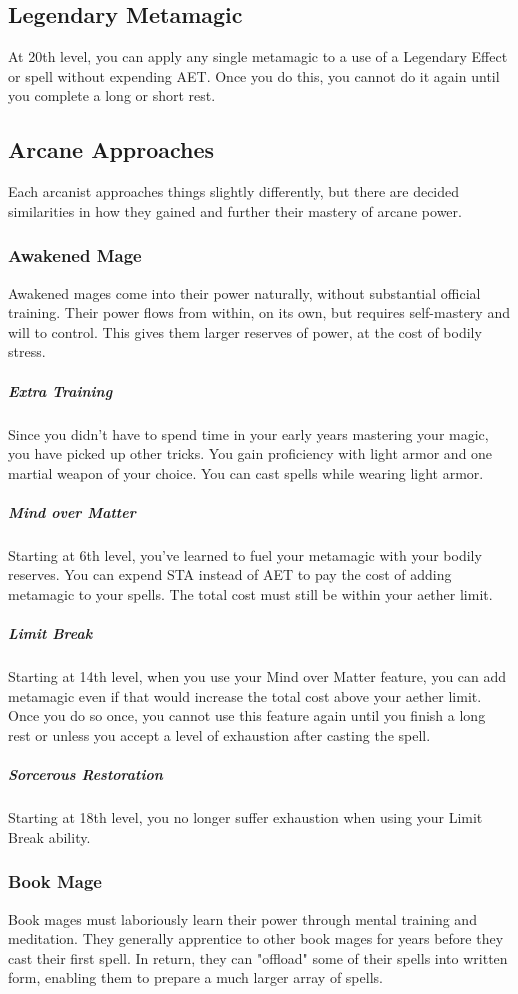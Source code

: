 \subsection{Legendary Metamagic}
At 20th level, you can apply any single metamagic to a use of a Legendary Effect or spell without expending AET. Once you do this, you cannot do it again until you complete a long or short rest.

\subsection{Arcane Approaches}

Each arcanist approaches things slightly differently, but there are decided similarities in how they gained and further their mastery of arcane power.

\subsubsection{Awakened Mage}
Awakened mages come into their power naturally, without substantial official training. Their power flows from within, on its own, but requires self-mastery and will to control. This gives them larger reserves of power, at the cost of bodily stress. 

\subparagraph*{Extra Training}
Since you didn't have to spend time in your early years mastering your magic, you have picked up other tricks. You gain proficiency with light armor and one martial weapon of your choice. You can cast spells while wearing light armor.

\subparagraph*{Mind over Matter}
Starting at 6th level, you've learned to fuel your metamagic with your bodily reserves. You can expend STA instead of AET to pay the cost of adding metamagic to your spells. The total cost must still be within your aether limit.

\subparagraph*{Limit Break}
Starting at 14th level, when you use your Mind over Matter feature, you can add metamagic even if that would increase the total cost above your aether limit. Once you do so once, you cannot use this feature again until you finish a long rest or unless you accept a level of exhaustion after casting the spell.

\subparagraph*{Sorcerous Restoration}
Starting at 18th level, you no longer suffer exhaustion when using your Limit Break ability.

\subsubsection{Book Mage}
Book mages must laboriously learn their power through mental training and meditation. They generally apprentice to other book mages for years before they cast their first spell. In return, they can "offload" some of their spells into written form, enabling them to prepare a much larger array of spells.


